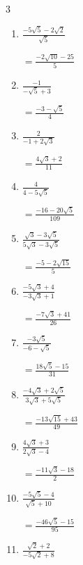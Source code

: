 \begin{multicols}{3}
\begin{enumerate}
        $\displaystyle =2\sqrt{6}+5$

  \item $\displaystyle \frac{-5\sqrt{5}-2\sqrt{2}}{\sqrt{5}}$

        $\displaystyle =\frac{-2\sqrt{10}-25}{5}$

  \item $\displaystyle \frac{-1}{-\sqrt{5}+3}$

        $\displaystyle =\frac{-3-\sqrt{5}}{4}$

  \item $\displaystyle \frac{2}{-1+2\sqrt{3}}$

        $\displaystyle =\frac{4\sqrt{3}+2}{11}$

\columnbreak %

  \item $\displaystyle \frac{4}{4-5\sqrt{5}}$

        $\displaystyle =\frac{-16-20\sqrt{5}}{109}$

  \item $\displaystyle \frac{\sqrt{3}-3\sqrt{5}}{5\sqrt{3}-3\sqrt{5}}$

        $\displaystyle =\frac{-5-2\sqrt{15}}{5}$

  \item $\displaystyle \frac{-5\sqrt{3}+4}{-3\sqrt{3}+1}$

        $\displaystyle =\frac{-7\sqrt{3}+41}{26}$

  \item $\displaystyle \frac{-3\sqrt{5}}{-6-\sqrt{5}}$

        $\displaystyle =\frac{18\sqrt{5}-15}{31}$

  \item $\displaystyle \frac{-4\sqrt{3}+2\sqrt{5}}{3\sqrt{3}+5\sqrt{5}}$

        $\displaystyle =\frac{-13\sqrt{15}+43}{49}$

\columnbreak %

\resetques

  \item $\displaystyle \frac{4\sqrt{3}+3}{2\sqrt{3}-4}$

        $\displaystyle =\frac{-11\sqrt{3}-18}{2}$

  \item $\displaystyle \frac{-5\sqrt{5}-4}{\sqrt{5}+10}$

        $\displaystyle =\frac{-46\sqrt{5}-15}{95}$

  \item $\displaystyle \frac{\sqrt{2}+2}{-5\sqrt{2}+8}$


\end{enumerate}
\end{multicols}
